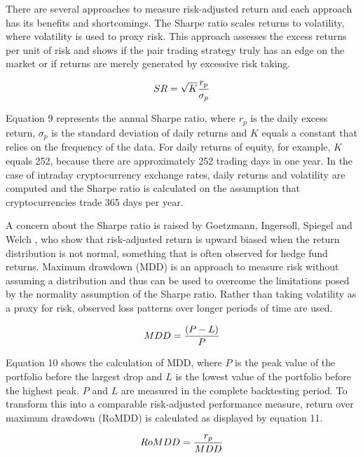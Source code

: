 \documentclass[12pt,english,authoryear]{article}
\begin{document}
There are several approaches to measure risk-adjusted return and each approach has its benefits and shortcomings. The Sharpe ratio \cite{Sharpe_1966} scales returns to volatility, where volatility is used to proxy risk. This approach assesses the excess returns per unit of risk and shows if the pair trading strategy truly has an edge on the market or if returns are merely generated by excessive risk taking. 

\begin{equation}
SR = \sqrt{K} {{r_p} \over \sigma_p}
\end{equation}

Equation 9 represents the annual Sharpe ratio, where $r_p$ is the daily excess return, $\sigma_p$ is the standard deviation of daily returns and $K$ equals a constant that relies on the frequency of the data. For daily returns of equity, for example, $K$ equals 252, because there are approximately 252 trading days in one year. In the case of intraday cryptocurrency exchange rates, daily returns and volatility are computed and the Sharpe ratio is calculated on the assumption that cryptocurrencies trade 365 days per year. 

A concern about the Sharpe ratio is raised by Goetzmann, Ingersoll, Spiegel and Welch \citeyear{Goetzmann_2002}, who show that risk-adjusted return is upward biased when the return distribution is not normal, something that is often observed for hedge fund returns. Maximum drawdown (MDD) is an approach to measure risk without assuming a distribution and thus can be used to overcome the limitations posed by the normality assumption of the Sharpe ratio. Rather than taking volatility as a proxy for risk, observed loss patterns over longer periods of time are used. 

\begin{equation}
MDD = {{(P-L)} \over P}
\end{equation}

Equation 10 shows the calculation of MDD, where $P$ is the peak value of the portfolio before the largest drop and $L$ is the lowest value of the portfolio before the highest peak. $P$ and $L$ are measured in the complete backtesting period. To transform this into a comparable risk-adjusted performance measure, return over maximum drawdown (RoMDD) is calculated as displayed by equation 11. 

\begin{equation}
RoMDD = {r_p \over MDD}
\end{equation}
\end{document}
